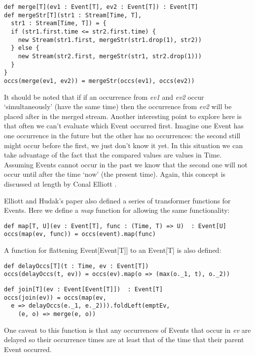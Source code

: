 \begin{verbatim}
def merge[T](ev1 : Event[T], ev2 : Event[T]) : Event[T]
def mergeStr[T](str1 : Stream[Time, T], 
  str1 : Stream[Time, T]) = {
  if (str1.first.time <= str2.first.time) {
    new Stream(str1.first, mergeStr(str1.drop(1), str2))
  } else {
    new Stream(str2.first, mergeStr(str1, str2.drop(1)))
  }
}
occs(merge(ev1, ev2)) = mergeStr(occs(ev1), occs(ev2))
\end{verbatim}            

      It should be noted that if if an occurrence from \emph{ev1} and \emph{ev2} occur `simultaneously' (have the same time) 
      then
      the occurrence from \emph{ev2} will be placed after in the merged stream. Another interesting point to explore
      here is that often we can't evaluate which Event occurred first. Imagine one Event has one occurrence in
      the future but the other has no occurrences: the second still might occur before the first, we just don't know it
      yet. In this situation we can take advantage of the fact that the compared values are values in Time. Assuming
      Events cannot occur in the past we know that the second one will not occur until after the time `now' (the
      present time). Again, this concept is discussed at length by Conal Elliott \cite{Elliott2009}.
       
      Elliott and Hudak's paper also defined a series of transformer functions for Events. Here we define a
     \emph{map} function for allowing the same functionality:

\begin{verbatim}
def map[T, U](ev : Event[T], func : (Time, T) => U)  : Event[U]
occs(map(ev, func)) = occs(event).map(func)
\end{verbatim}     

      A function for flattening Event[Event[T]] to an Event[T] is also defined:

\begin{verbatim}
def delayOccs[T](t : Time, ev : Event[T])
occs(delayOccs(t, ev)) = occs(ev).map(o => (max(o._1, t), o._2))
\end{verbatim}

\begin{verbatim}
def join[T](ev : Event[Event[T]])  : Event[T]
occs(join(ev)) = occs(map(ev, 
  e => delayOccs(e._1, e._2))).foldLeft(emptEv,
    (e, o) => merge(e, o))
\end{verbatim}        

      One caveat to this function is that any occurrences of Events that occur in \emph{ev} are delayed
      so their occurrence times are at least that of the time that their parent Event occurred.
      
